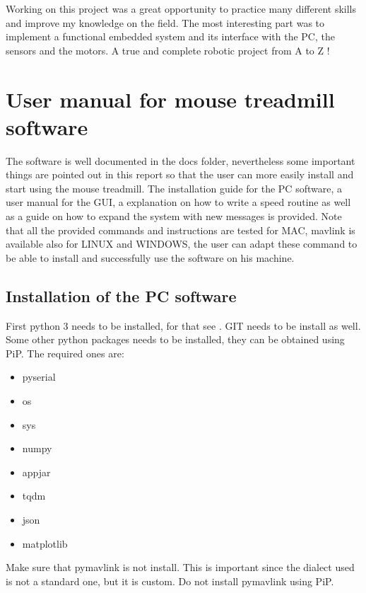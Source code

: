 \documentclass[12pt,a4paper, twoside]{article}
\begin{document}
Working on this project was a great opportunity to practice many different skills and improve my knowledge on the field. The most interesting part was to implement a functional embedded system and its interface with the PC, the sensors and the motors. A true and complete robotic project from A to Z !



\newpage
\section[User manual]{User manual for mouse treadmill software}\label{sec:user_manual}
The software is well documented in the docs folder, nevertheless some important things are pointed out in this report so that the user can more easily install and start using the mouse treadmill. The installation guide for the PC software, a user manual for the GUI, a explanation on how to write a speed routine as well as a guide on how to expand the system with new messages is provided. Note that all the provided commands and instructions are tested for MAC, mavlink is available also for LINUX and WINDOWS, the user can adapt these command to be able to install and successfully use the software on his machine. 
\subsection{Installation of the PC software}\label{sec:install}
First python 3 needs to be installed, for that see \cite{py}. GIT needs to be install as well. Some other python packages needs to be installed, they can be obtained using PiP. The required ones are:\\
\begin{multicols}{3}[]
	\begin{itemize}
		\item pyserial
		\item os
		\item sys
		\item numpy
		\item appjar
		\item tqdm
		\item json
		\item matplotlib
	\end{itemize}
\end{multicols}

Make sure that pymavlink is not install. This is important since the dialect used is not a standard one, but it is custom. Do not install pymavlink using PiP.\\
\end{document}
